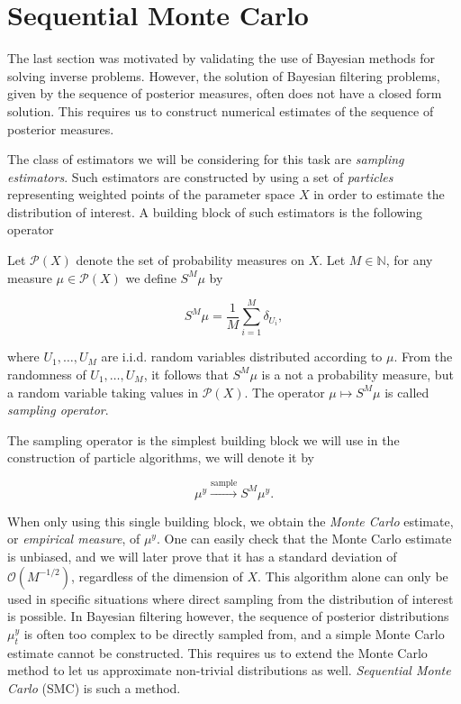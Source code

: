 \section{Sequential Monte Carlo}
The last section was motivated by validating the use of Bayesian methods for solving inverse problems. However, the solution of Bayesian filtering problems, given by the sequence of posterior measures, often does not have a closed form solution. This requires us to construct numerical estimates of the sequence of posterior measures.

The class of estimators we will be considering for this task are \textit{sampling estimators}. Such estimators are constructed by using a set of \textit{particles} representing weighted points of the parameter space $X$ in order to estimate the distribution of interest. A building block of such estimators is the following operator

\begin{definition}
  Let $\mathcal{P}(X)$ denote the set of probability measures on $X$. Let $M \in \mathbb{N}$, for any measure $\mu \in \mathcal{P}(X)$ we define $S^M\mu$ by

  \begin{equation*}
    S^M\mu = \frac1{M}\sum_{i=1}^M\delta_{U_i},
  \end{equation*}

  where $U_1, \ldots, U_M$ are i.i.d. random variables distributed according to $\mu$. From the randomness of $U_1, \ldots, U_M$, it follows that $S^M\mu$ is a not a probability measure, but a random variable taking values in $\mathcal{P}(X)$. The operator $\mu \mapsto S^M\mu$ is called \textit{sampling operator}.
\end{definition}

The sampling operator is the simplest building block we will use in the construction of particle algorithms, we will denote it by
 
\begin{equation*}
  \mu^y \xrightarrow{\text{sample}} S^M\mu^y.
\end{equation*}

When only using this single building block, we obtain the \textit{Monte Carlo} estimate, or \textit{empirical measure}, of $\mu^y$. One can easily check that the Monte Carlo estimate is unbiased, and we will later prove that it has a standard deviation of $\mathcal{O}(M^{-1/2})$, regardless of the dimension of $X$. This algorithm alone can only be used in specific situations where direct sampling from the distribution of interest is possible. In Bayesian filtering however, the sequence of posterior distributions $\mu^y_t$ is  often too complex to be directly sampled from, and a simple Monte Carlo estimate cannot be constructed. This requires us to extend the Monte Carlo method to let us approximate non-trivial distributions as well. \textit{Sequential Monte Carlo} (SMC) is such a method.

